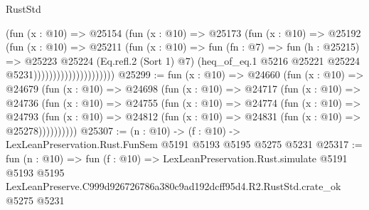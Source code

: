 \begin{lexlean}{RustStd}
\begin{coremodule}
                                  (fun (x : @10) =>
                                  @25154
                                    (fun (x : @10) =>
                                    @25173
                                      (fun (x : @10) =>
                                      @25192
                                        (fun (x : @10) =>
                                        @25211
                                          (fun (x : @10) =>
                                          fun (fn : @7) =>
                                          fun (h : @25215) =>
                                          @25223
                                            @25224
                                            (Eq.refl.{2} (Sort 1) @7)
                                            (heq_of_eq.{1}
                                              @5216
                                              @25221
                                              @25224
                                              @5231)))))))))))))))))))))
@25299 := fun (x : @10) =>
  @24660
    (fun (x : @10) =>
    @24679
      (fun (x : @10) =>
      @24698
        (fun (x : @10) =>
        @24717
          (fun (x : @10) =>
          @24736
            (fun (x : @10) =>
            @24755
              (fun (x : @10) =>
              @24774
                (fun (x : @10) =>
                @24793
                  (fun (x : @10) =>
                  @24812 (fun (x : @10) => @24831 (fun (x : @10) => @25278))))))))))
@25307 := (n : @10) -> (f : @10) -> LexLeanPreservation.Rust.FunSem @5191 @5193 @5195 @5275 @5231
@25317 := fun (n : @10) =>
  fun (f : @10) =>
  LexLeanPreservation.Rust.simulate
    @5191
    @5193
    @5195
    LexLeanPreserve.C999d926726786a380c9ad192dcff95d4.R2.RustStd.crate_ok
    @5275
    @5231
\end{coremodule}
\end{lexlean}
